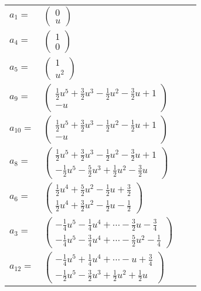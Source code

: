 \documentclass[1p]{elsarticle_modified}
\theoremstyle{definition}
\begin{document}
\begin{tabular}{m{7pt} m{180pt} m{7pt} m{180pt} }
\flushright $a_{1}=$&$\begin{pmatrix}0\\u\end{pmatrix}$ \\
\flushright $a_{4}=$&$\begin{pmatrix}1\\0\end{pmatrix}$ \\
\flushright $a_{5}=$&$\begin{pmatrix}1\\u^2\end{pmatrix}$ \\
\flushright $a_{9}=$&$\begin{pmatrix}\frac{1}{2} u^5+\frac{3}{2} u^3-\frac{1}{2} u^2-\frac{3}{2} u+1\\- u\end{pmatrix}$ \\
\flushright $a_{10}=$&$\begin{pmatrix}\frac{1}{2} u^5+\frac{3}{2} u^3-\frac{1}{2} u^2-\frac{1}{2} u+1\\- u\end{pmatrix}$ \\
\flushright $a_{8}=$&$\begin{pmatrix}\frac{1}{2} u^5+\frac{3}{2} u^3-\frac{1}{2} u^2-\frac{3}{2} u+1\\-\frac{1}{2} u^5-\frac{5}{2} u^3+\frac{1}{2} u^2-\frac{3}{2} u\end{pmatrix}$ \\
\flushright $a_{6}=$&$\begin{pmatrix}\frac{1}{2} u^4+\frac{5}{2} u^2-\frac{1}{2} u+\frac{3}{2}\\\frac{1}{2} u^4+\frac{3}{2} u^2-\frac{1}{2} u-\frac{1}{2}\end{pmatrix}$ \\
\flushright $a_{3}=$&$\begin{pmatrix}-\frac{1}{4} u^5-\frac{1}{4} u^4+\cdots-\frac{3}{2} u-\frac{3}{4}\\-\frac{1}{4} u^5-\frac{3}{4} u^4+\cdots-\frac{5}{2} u^2-\frac{1}{4}\end{pmatrix}$ \\
\flushright $a_{12}=$&$\begin{pmatrix}-\frac{1}{4} u^5+\frac{1}{4} u^4+\cdots- u+\frac{3}{4}\\-\frac{1}{2} u^5-\frac{3}{2} u^3+\frac{1}{2} u^2+\frac{1}{2} u\end{pmatrix}$ \\

\end{tabular}
\end{document}
